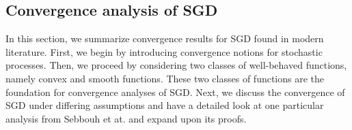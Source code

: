 \documentclass[12pt]{article}
\theoremstyle{definition}
\newtheorem{definition}[definition]{Definition}
\numberwithin{equation}{section}
\newcommand{\R}{\mathbb{R}}
\begin{document}
\subsection{Convergence analysis of SGD}
\label{subsec:convergence_analysis_of_sgd}
In this section, we summarize convergence results for SGD found in modern literature. First, we begin by introducing convergence notions for stochastic processes. Then, we proceed by considering two classes of well-behaved functions, namely convex and smooth functions. These two classes of functions are the foundation for convergence analyses of SGD. Next, we discuss the convergence of SGD under differing assumptions and have a detailed look at one particular analysis from Sebbouh et at.\cite{sebbouhAlmostSureConvergence2021} and expand upon its proofs. 
\end{document}

